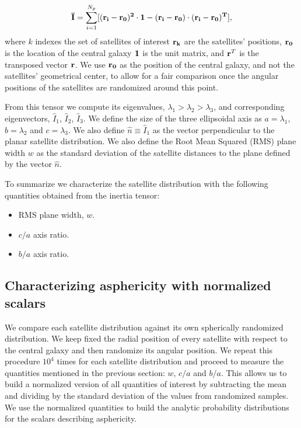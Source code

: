 \documentclass[a4paper,fleqn,usenatbib]{mnras}
\begin{document}
\begin{equation}
{\bf{\bar{I}}} = \sum_{i=1}^{N_p}[(\bf{r}_i - \bf{r}_0)^2\cdot \bf{1} -
  (\bf{r}_i-\bf{r}_0)\cdot (\bf{r}_i - \bf{r}_0)^{T}],
\label{eq:intensor}
\end{equation}
%
where $k$ indexes the set of satellites of interest
$\bf{r}_k$ are the satellites' positions, $\bf{r}_{0}$ is the location
of the central galaxy $\bf{1}$ is the unit matrix, and  
${\bf r}^T$ is the transposed vector $\bf{r}$. 
We use $\bf{r}_0$ as the position of the central galaxy, and not the
satellites' geometrical center, to allow for a fair comparison once
the angular positions of the satellites are randomized around this
point. 

From this tensor we compute its eigenvalues,
$\lambda_1>\lambda_2>\lambda_3$, and corresponding eigenvectors,
$\hat{I}_1$, $\hat{I}_2$, $\hat{I}_3$.
We define the size of the three ellipsoidal axis as
$a=\lambda_1$, $b=\lambda_2$ and $c=\lambda_3$.
We also define $\hat{n}\equiv \hat{I}_1$ as the vector perpendicular to the
planar satellite distribution. 
We also define the Root Mean Squared (RMS) plane width $w$ as the
standard deviation of the satellite distances to the plane defined by
the vector $\hat{n}$.    

To summarize we characterize the satellite distribution with the following
quantities obtained from the inertia tensor: 
\begin{itemize}
\item RMS plane width, $w$.
\item $c/a$ axis ratio.
\item $b/a$ axis ratio.
\end{itemize}



\subsection{Characterizing asphericity with normalized scalars}
\label{sec:normalization}
We compare each satellite distribution against its own spherically
randomized distribution.
We keep fixed the radial position of every satellite
with respect to the central galaxy and then randomize its angular
position. 
We repeat this procedure $10^4$ times for each satellite distribution
and proceed to measure the quantities mentioned in the previous section:
$w$, $c/a$ and $b/a$.
This allows us to build a normalized version of all quantities of
interest by subtracting the mean and dividing by the standard
deviation of the values from randomized samples.
We use the normalized quantities to build the analytic probability
distributions for the scalars describing asphericity. 
\end{document}
